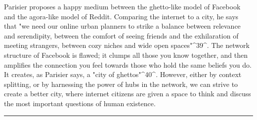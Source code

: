 \documentclass[]{article}
\begin{document}
Parisier proposes a happy medium between the ghetto-like model of
Facebook and the agora-like model of Reddit. Comparing the internet to a
city, he says that "we need our online urban planners to strike a
balance between relevance and serendipity, between the comfort of seeing
friends and the exhilaration of meeting strangers, between cozy niches
and wide open spaces"\^{}39\^{}. The network structure of Facebook is
flawed; it clumps all those you know together, and then amplifies the
connection you feel towards those who hold the same beliefs you do. It
creates, as Parisier says, a "city of ghettos"\^{}40\^{}. However,
either by context splitting, or by harnessing the power of hubs in the
network, we can strive to create a better city, where internet citizens
are given a space to think and discuss the most important questions of
human existence.

\begin{center}\rule{0.5\linewidth}{\linethickness}\end{center}
\end{document}
